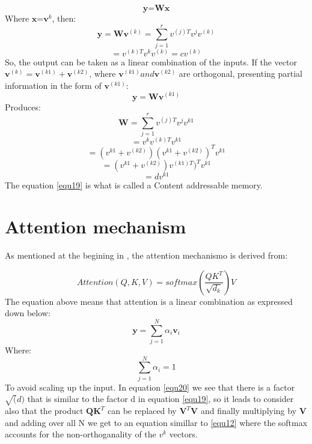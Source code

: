 \documentclass[journal]{IEEEtai}
\begin{document}
\begin{equation}\label{equ11}
\textbf{y}=\textbf{W}\textbf{x}
\end{equation}
Where $\textbf{x}$=$\textbf{v}^{k}$, then:
\begin{equation}\label{equ12}
\textbf{y}=\textbf{W}\textbf{v}^{(k)}=\sum_{j=1}^{r} v^{(j)T}v^{j}v^{(k)}
\end{equation}
\begin{equation}\label{equ13}
=v^{(k)T}v^{k}v^{(k)}=cv^{(k)}
\end{equation}
So, the output can be taken as a linear combination of the inputs. If the vector $\textbf{v}^{(k)}=\textbf{v}^{(k1)}+\textbf{v}^{(k2)} $, where $\textbf{v}^{(k1)} and \textbf{v}^{(k2)}$ are orthogonal, presenting partial information in the form of $\textbf{v}^{(k1)}$:
\begin{equation}\label{equ14}
\textbf{y}=\textbf{W}\textbf{v}^{(k1)}
\end{equation}
Produces:
\begin{equation}\label{equ15}
\textbf{W}=\sum_{j=1}^{r} v^{(j)T}v^{j}v^{k1}
\end{equation}
\begin{equation}\label{equ16}
= v^{k}v^{(k)T}v^{k1}
\end{equation}
\begin{equation}\label{equ17}
= (v^{k1}+v^{(k2)})(v^{k1}+v^{(k2)})^Tv^{k1} 
\end{equation}
\begin{equation}\label{equ18}
= (v^{k1}+v^{(k2)})v^{(k1)T})^Tv^{k1} 
\end{equation}
\begin{equation}\label{equ19}
= dv^{k1} 
\end{equation}
The equation \eqref{equ19} is what is called a Content addressable memory.
\section{Attention mechanism}

As mentioned at the begining in \cite{Attention}, the attention mechanismo is derived from:

\begin{equation}\label{equ20}
Attention(Q,K,V) = softmax(\frac{QK^{T}}{\sqrt{d_{k}}})V 
\end{equation}
The equation above means that attention is a linear combination as expressed down below:
\begin{equation}\label{equ21}
\textbf{y} = \sum_{j=1}^{N}\alpha_{i}\textbf{v}_{i}
\end{equation}
Where:
\begin{equation}\label{equ22}
\sum_{j=1}^{N}\alpha_{i}=1
\end{equation}
To avoid scaling up the input.
In equation \ref{equ20} we see that there is  a factor $\sqrt(d)$ that is similar to the factor d in equation \ref{equ19}, so it leads to consider also that the product $\textbf{QK}^T$ can be replaced by $\textbf{V}^T\textbf{V}$ and finally multiplying  by $\textbf{V}$ and adding over all N we get to an equation simillar to \ref{equ12} where the softmax accounts for the non-orthoganality of the $v^{k}$ vectors.
\end{document}

